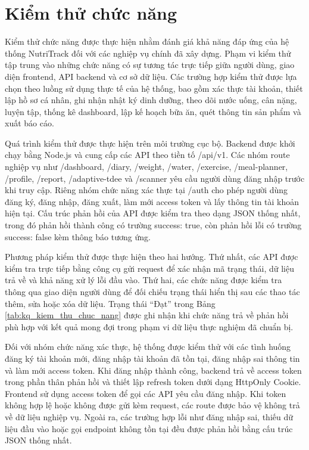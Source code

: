 \documentclass[12pt, a4paper]{report}
\begin{document}
\section{Kiểm thử chức năng}Kiểm thử chức năng được thực hiện nhằm đánh giá khả năng đáp ứng của hệ thống NutriTrack đối với các nghiệp vụ chính đã xây dựng. Phạm vi kiểm thử tập trung vào những chức năng có sự tương tác trực tiếp giữa người dùng, giao diện frontend, API backend và cơ sở dữ liệu. Các trường hợp kiểm thử được lựa chọn theo luồng sử dụng thực tế của hệ thống, bao gồm xác thực tài khoản, thiết lập hồ sơ cá nhân, ghi nhận nhật ký dinh dưỡng, theo dõi nước uống, cân nặng, luyện tập, thống kê dashboard, lập kế hoạch bữa ăn, quét thông tin sản phẩm và xuất báo cáo.

Quá trình kiểm thử được thực hiện trên môi trường cục bộ. Backend được khởi chạy bằng Node.js và cung cấp các API theo tiền tố /api/v1. Các nhóm route nghiệp vụ như /dashboard, /diary, /weight, /water, /exercise, /meal-planner, /profile, /report, /adaptive-tdee và /scanner yêu cầu người dùng đăng nhập trước khi truy cập. Riêng nhóm chức năng xác thực tại /auth cho phép người dùng đăng ký, đăng nhập, đăng xuất, làm mới access token và lấy thông tin tài khoản hiện tại. Cấu trúc phản hồi của API được kiểm tra theo dạng JSON thống nhất, trong đó phản hồi thành công có trường success: true, còn phản hồi lỗi có trường success: false kèm thông báo tương ứng.

Phương pháp kiểm thử được thực hiện theo hai hướng. Thứ nhất, các API được kiểm tra trực tiếp bằng công cụ gửi request để xác nhận mã trạng thái, dữ liệu trả về và khả năng xử lý lỗi đầu vào. Thứ hai, các chức năng được kiểm tra thông qua giao diện người dùng để đối chiếu trạng thái hiển thị sau các thao tác thêm, sửa hoặc xóa dữ liệu. Trạng thái “Đạt” trong Bảng \ref{tab:kq_kiem_thu_chuc_nang} được ghi nhận khi chức năng trả về phản hồi phù hợp với kết quả mong đợi trong phạm vi dữ liệu thực nghiệm đã chuẩn bị.

Đối với nhóm chức năng xác thực, hệ thống được kiểm thử với các tình huống đăng ký tài khoản mới, đăng nhập tài khoản đã tồn tại, đăng nhập sai thông tin và làm mới access token. Khi đăng nhập thành công, backend trả về access token trong phần thân phản hồi và thiết lập refresh token dưới dạng HttpOnly Cookie. Frontend sử dụng access token để gọi các API yêu cầu đăng nhập. Khi token không hợp lệ hoặc không được gửi kèm request, các route được bảo vệ không trả về dữ liệu nghiệp vụ. Ngoài ra, các trường hợp lỗi như đăng nhập sai, thiếu dữ liệu đầu vào hoặc gọi endpoint không tồn tại đều được phản hồi bằng cấu trúc JSON thống nhất.
\end{document}

